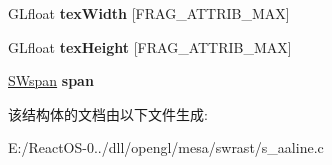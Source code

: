 \begin{DoxyCompactItemize}
\mbox{\label{struct_line_info_a58590e1078f34f188915910d987dba47}} 
G\+Lfloat {\bfseries tex\+Width} \mbox{[}F\+R\+A\+G\+\_\+\+A\+T\+T\+R\+I\+B\+\_\+\+M\+AX\mbox{]}
\item 
\mbox{\label{struct_line_info_ae4be1ccd2a9c80cbc698dde93f001fea}} 
G\+Lfloat {\bfseries tex\+Height} \mbox{[}F\+R\+A\+G\+\_\+\+A\+T\+T\+R\+I\+B\+\_\+\+M\+AX\mbox{]}
\item 
\mbox{\label{struct_line_info_a60b310231227efc2a3d838572e550132}} 
\hyperlink{structsw__span}{S\+Wspan} {\bfseries span}
\end{DoxyCompactItemize}


该结构体的文档由以下文件生成\+:\begin{DoxyCompactItemize}
\item 
E\+:/\+React\+O\+S-\/0../dll/opengl/mesa/swrast/s\+\_\+aaline.\+c\end{DoxyCompactItemize}
